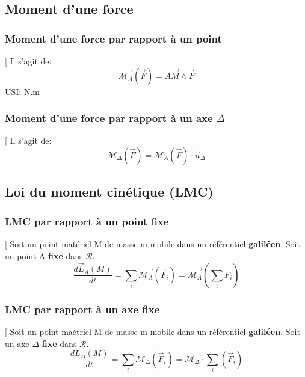 \documentclass[12pt,hidelinks]{article}
\begin{document}
    \subsection{Moment d'une force}
        \subsubsection{Moment d'une force par rapport à un point}
            \begin{DashedDefinition}{}[
            Il s'agit de:
            \[\overrightarrow{\mathcal{M}_A}(\vec F)= \overrightarrow{AM} \wedge \vec F\]
            USI: N.m
            \end{DashedDefinition}
            
        \subsubsection{Moment d'une force par rapport à un axe $\Delta$}
            \begin{DashedDefinition}{}[
            Il s'agit de:
            \[\mathcal{M}_\Delta(\vec F)= \mathcal{M}_A(\vec F) \cdot \vec u_\Delta\]
            \end{DashedDefinition}
            
    \subsection{Loi du moment cinétique (LMC)}
        \subsubsection{LMC par rapport à un point fixe}
            \begin{DashedDefinition}{}[
                Soit un point matériel M de masse m mobile dans un référentiel \textbf{galiléen}. Soit un point A \textbf{fixe} dans $\mathcal{R}$.
                \[\frac{d \vec L_A(M)}{dt}=\sum_i \overrightarrow{\mathcal{M}_A}(\vec F_i)=\overrightarrow{\mathcal{M}_A} (\sum_i F_i)\]
            \end{DashedDefinition}
            
        \subsubsection{LMC par rapport à un axe fixe}
            \begin{DashedDefinition}{}[
                Soit un point maétriel M de masse m mobile dans un référentiel \textbf{galiléen}. Soit un axe $\Delta$ \textbf{fixe} dans $\mathcal{R}$.
                \[\frac{dL_\Delta(M)}{dt}=\sum_i \mathcal{M}_\Delta(\vec F_i)= \mathcal{M}_\Delta \cdot \sum_i(\vec F_i)\]
            \end{DashedDefinition}
\end{document}
